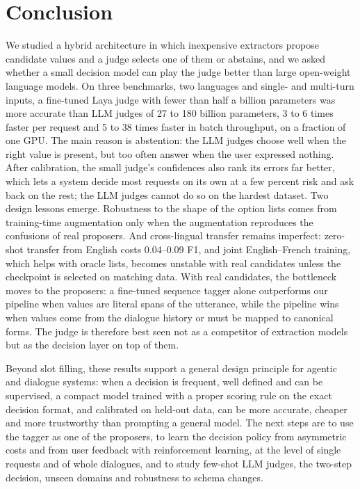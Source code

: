 \section{Conclusion}
\label{sec:conclusion}

We studied a hybrid architecture in which inexpensive extractors propose candidate values and a judge selects one of them or abstains, and we asked whether a small decision model can play the judge better than large open-weight language models. On three benchmarks, two languages and single- and multi-turn inputs, a fine-tuned Laya judge with fewer than half a billion parameters was more accurate than LLM judges of 27 to 180 billion parameters, 3 to 6 times faster per request and 5 to 38 times faster in batch throughput, on a fraction of one GPU. The main reason is abstention: the LLM judges choose well when the right value is present, but too often answer when the user expressed nothing. After calibration, the small judge's confidences also rank its errors far better, which lets a system decide most requests on its own at a few percent risk and ask back on the rest; the LLM judges cannot do so on the hardest dataset. Two design lessons emerge. Robustness to the shape of the option lists comes from training-time augmentation only when the augmentation reproduces the confusions of real proposers. And cross-lingual transfer remains imperfect: zero-shot transfer from English costs 0.04--0.09 F1, and joint English--French training, which helps with oracle lists, becomes unstable with real candidates unless the checkpoint is selected on matching data. With real candidates, the bottleneck moves to the proposers: a fine-tuned sequence tagger alone outperforms our pipeline when values are literal spans of the utterance, while the pipeline wins when values come from the dialogue history or must be mapped to canonical forms. The judge is therefore best seen not as a competitor of extraction models but as the decision layer on top of them.

Beyond slot filling, these results support a general design principle for agentic and dialogue systems: when a decision is frequent, well defined and can be supervised, a compact model trained with a proper scoring rule on the exact decision format, and calibrated on held-out data, can be more accurate, cheaper and more trustworthy than prompting a general model. The next steps are to use the tagger as one of the proposers, to learn the decision policy from asymmetric costs and from user feedback with reinforcement learning, at the level of single requests and of whole dialogues, and to study few-shot LLM judges, the two-step decision, unseen domains and robustness to schema changes.
